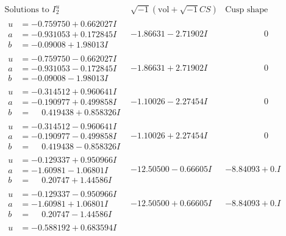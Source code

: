 \documentclass[1p]{elsarticle_modified}
\theoremstyle{definition}
\newcommand{\I}{\sqrt{-1}}
\begin{document}
$$\begin{array}{c|c|c}  
\text{Solutions to }I^u_{2}& \I (\text{vol} + \sqrt{-1}CS) & \text{Cusp shape}\\
 \hline 
\begin{aligned}
u &= -0.759750 + 0.662027 I \\
a &= -0.931053 + 0.172845 I \\
b &= -0.09008 + 1.98013 I\end{aligned}
 & -1.86631 - 2.71902 I & \phantom{-0.000000 } 0 \\ \hline\begin{aligned}
u &= -0.759750 - 0.662027 I \\
a &= -0.931053 - 0.172845 I \\
b &= -0.09008 - 1.98013 I\end{aligned}
 & -1.86631 + 2.71902 I & \phantom{-0.000000 } 0 \\ \hline\begin{aligned}
u &= -0.314512 + 0.960641 I \\
a &= -0.190977 + 0.499858 I \\
b &= \phantom{-}0.419438 + 0.858326 I\end{aligned}
 & -1.10026 - 2.27454 I & \phantom{-0.000000 } 0 \\ \hline\begin{aligned}
u &= -0.314512 - 0.960641 I \\
a &= -0.190977 - 0.499858 I \\
b &= \phantom{-}0.419438 - 0.858326 I\end{aligned}
 & -1.10026 + 2.27454 I & \phantom{-0.000000 } 0 \\ \hline\begin{aligned}
u &= -0.129337 + 0.950966 I \\
a &= -1.60981 - 1.06801 I \\
b &= \phantom{-}0.20747 + 1.44586 I\end{aligned}
 & -12.50500 - 0.66605 I & -8.84093 + 0. I\phantom{ +0.000000I} \\ \hline\begin{aligned}
u &= -0.129337 - 0.950966 I \\
a &= -1.60981 + 1.06801 I \\
b &= \phantom{-}0.20747 - 1.44586 I\end{aligned}
 & -12.50500 + 0.66605 I & -8.84093 + 0. I\phantom{ +0.000000I} \\ \hline\begin{aligned}
u &= -0.588192 + 0.683594 I \\

\end{aligned}
\end{array}$$
\end{document}
